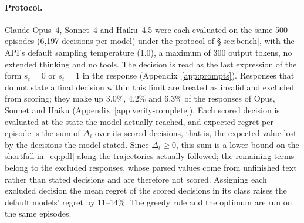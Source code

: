 \documentclass[10pt,a4paper,twocolumn]{article}
\begin{document}
\paragraph{Protocol.} Claude Opus~4, Sonnet~4 and Haiku~4.5 were each evaluated on the same 500 episodes (6{,}197 decisions per model) under the protocol of \S\ref{sec:bench}, with the API's default sampling temperature (1.0), a maximum of 300 output tokens, no extended thinking and no tools. The decision is read as the last expression of the form $s_t=0$ or $s_t=1$ in the response (Appendix~\ref{app:prompts}). Responses that do not state a final decision within this limit are treated as invalid and excluded from scoring; they make up 3.0\%, 4.2\% and 6.3\% of the responses of Opus, Sonnet and Haiku (Appendix~\ref{app:verify-complete}). Each scored decision is evaluated at the state the model actually reached, and expected regret per episode is the sum of $\Delta_t$ over its scored decisions, that is, the expected value lost by the decisions the model stated. Since $\Delta_t\ge0$, this sum is a lower bound on the shortfall in~\eqref{eq:pdl} along the trajectories actually followed; the remaining terms belong to the excluded responses, whose parsed values come from unfinished text rather than stated decisions and are therefore not scored. Assigning each excluded decision the mean regret of the scored decisions in its class raises the default models' regret by 11--14\%. The greedy rule and the optimum are run on the same episodes.
\end{document}
